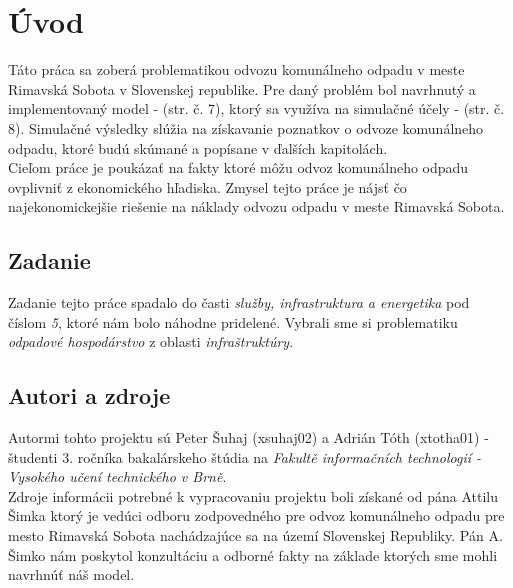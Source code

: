 \documentclass[11pt,a4paper]{article}
\begin{document}

\setlength{\parskip}{0pt}
\hypersetup{hidelinks}\tableofcontents
\setlength{\parskip}{0pt}

\newpage %

\section{Úvod}

    \indent Táto práca sa zoberá problematikou odvozu komunálneho odpadu v meste Rimavská Sobota v Slovenskej republike. Pre daný problém bol navrhnutý a implementovaný model - \cite{IMS}(str. č. 7), ktorý sa využíva na simulačné účely - \cite{IMS}(str. č. 8). Simulačné výsledky slúžia na získavanie poznatkov o odvoze komunálneho odpadu, ktoré budú skúmané a popísane v ďalších kapitolách.\\[0.4em]
    \indent Cieľom práce je poukázať na fakty ktoré môžu odvoz komunálneho odpadu ovplivniť z ekonomického hľadiska. Zmysel tejto práce je nájsť čo najekonomickejšie riešenie na náklady odvozu odpadu v meste Rimavská Sobota.

    \subsection{Zadanie}

        \indent Zadanie tejto práce spadalo do časti \textit{služby, infrastruktura a energetika}\cite{IMS-TEMA} pod číslom \textit{5}, ktoré nám bolo náhodne pridelené. Vybrali sme si problematiku \textit{odpadové hospodárstvo} z oblasti \textit{infraštruktúry}.

    \subsection{Autori a zdroje}

        \indent Autormi tohto projektu sú Peter Šuhaj (xsuhaj02) a Adrián Tóth (xtotha01) - študenti 3. ročníka bakalárskeho štúdia na \textit{Fakultě informačních technologií - Vysokého učení technického v Brně}\cite{VUT-FIT}.\\[0.4em]
        \indent Zdroje informácii potrebné k vypracovaniu projektu boli získané od pána Attilu Šimka ktorý je vedúci odboru zodpovedného pre odvoz komunálneho odpadu pre mesto Rimavská Sobota nachádzajúce sa na území Slovenskej Republiky. Pán A. Šimko nám poskytol konzultáciu a odborné fakty na základe ktorých sme mohli navrhnúť náš model.
\end{document}
